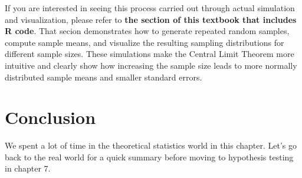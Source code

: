 \documentclass[
  letterpaper,
  DIV=11,
  numbers=noendperiod]{scrreprt}
\begin{document}

If you are interested in seeing this process carried out through actual
simulation and visualization, please refer to \textbf{the section of
this textbook that includes R code}. That secion demonstrates how to
generate repeated random samples, compute sample means, and visualize
the resulting sampling distributions for different sample sizes. These
simulations make the Central Limit Theorem more intuitive and clearly
show how increasing the sample size leads to more normally distributed
sample means and smaller standard errors.


\chapter*{Conclusion}\label{conclusion-5}


We spent a lot of time in the theoretical statistics world in this
chapter. Let's go back to the real world for a quick summary before
moving to hypothesis testing in chapter 7.
\end{document}
